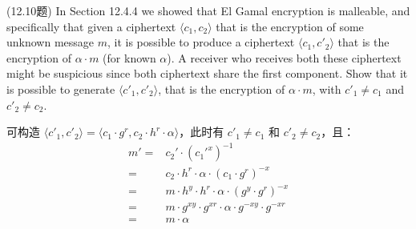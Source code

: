 \begin{questions}
    \question (12.10题) In Section 12.4.4 we showed that El Gamal encryption is malleable, and specifically that given a ciphertext $\langle{c_1,c_2}\rangle$ that is the encryption of some unknown message $m$, it is possible to produce a ciphertext $\langle{c_1,c'_2}\rangle$ that is the encryption of $\alpha\cdot{m}$ (for known $\alpha$). A receiver who receives both these ciphertext might be suspicious since both ciphertext share the first component. Show that it is possible to generate $\langle{c'_1,c'_2}\rangle$, that is the encryption of $\alpha\cdot{m}$, with $c'_1\neq{c_1}$ and $c'_2\neq{c_2}$.

        \begin{solution}
            \newline
            可构造 $\langle{c'_1,c'_2}\rangle=\langle{c_1\cdot{g}^r,c_2\cdot{h}^r\cdot\alpha}\rangle$，此时有 $c'_1\neq{c_1}$ 和 $c'_2\neq{c_2}$，且：
            \begin{equation}
                \begin{aligned}
                    m'=&c_2'\cdot({c_1'^x})^{-1}\\
                    =&c_2\cdot{h}^r\cdot\alpha\cdot(c_1\cdot{g}^r)^{-x}\\
                    =&m\cdot{h}^y\cdot{h}^r\cdot\alpha\cdot(g^y\cdot{g}^r)^{-x}\\
                    =&m\cdot{g}^{xy}\cdot{g}^{xr}\cdot\alpha\cdot{g}^{-xy}\cdot{g}^{-xr}\\
                    =&m\cdot\alpha
                \end{aligned}
            \end{equation}
        \end{solution}

\end{questions}



